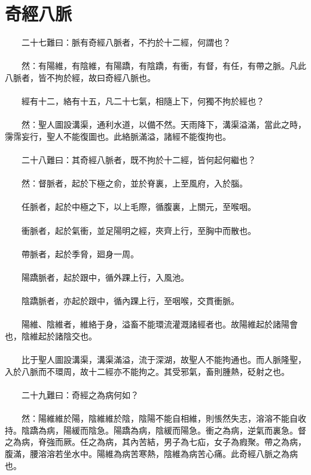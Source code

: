\section{奇經八脈}

　　二十七難曰：脈有奇經八脈者，不扚於十二經，何謂也？
\\\\
　　然：有陽維，有陰維，有陽蹻，有陰蹻，有衝，有督，有任，有帶之脈。凡此八脈者，皆不拘於經，故曰奇經八脈也。
\\\\
　　經有十二，絡有十五，凡二十七氣，相隨上下，何獨不拘於經也？
\\\\
　　然：聖人圖設溝渠，通利水道，以備不然。天雨降下，溝渠溢滿，當此之時，霶霈妄行，聖人不能復圖也。此絡脈滿溢，諸經不能復拘也。
\\\\
　　二十八難曰：其奇經八脈者，既不拘於十二經，皆何起何繼也？
\\\\
　　然：督脈者，起於下極之俞，並於脊裏，上至風府，入於腦。
\\\\
　　任脈者，起於中極之下，以上毛際，循腹裏，上關元，至喉咽。
\\\\
　　衝脈者，起於氣衝，並足陽明之經，夾齊上行，至胸中而散也。
\\\\
　　帶脈者，起於季脅，廻身一周。
\\\\
　　陽蹻脈者，起於跟中，循外踝上行，入風池。
\\\\
　　陰蹻脈者，亦起於跟中，循內踝上行，至咽喉，交貫衝脈。
\\\\
　　陽維、陰維者，維絡于身，溢畜不能環流灌溉諸經者也。故陽維起於諸陽會也，陰維起於諸陰交也。
\\\\
　　比于聖人圖設溝渠，溝渠滿溢，流于深湖，故聖人不能拘通也。而人脈隆聖，入於八脈而不環周，故十二經亦不能拘之。其受邪氣，畜則腫熱，砭射之也。
\\\\
　　二十九難曰：奇經之為病何如？
\\\\
　　然：陽維維於陽，陰維維於陰，陰陽不能自相維，則悵然失志，溶溶不能自收持。陰蹻為病，陽緩而陰急。陽蹻為病，陰緩而陽急。衝之為病，逆氣而裏急。督之為病，脊強而厥。任之為病，其內苦結，男子為七疝，女子為瘕聚。帶之為病，腹滿，腰溶溶若坐水中。陽維為病苦寒熱，陰維為病苦心痛。此奇經八脈之為病也。